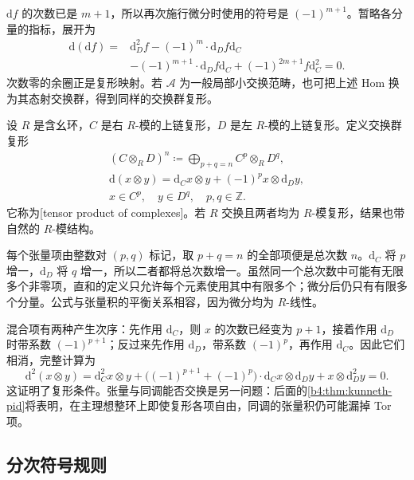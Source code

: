 \(\mathrm{d}f\) 的次数已是 \(m+1\)，所以再次施行微分时使用的符号是 \((-1)^{m+1}\)。暂略各分量的指标，展开为
\[
	\begin{aligned}
		\mathrm{d}(\mathrm{d}f) ={}&\mathrm{d}_D^2f-(-1)^m\cdot\mathrm{d}_Df\mathrm{d}_C\\
		&-(-1)^{m+1}\cdot\mathrm{d}_Df\mathrm{d}_C +(-1)^{2m+1}f\mathrm{d}_C^2=0.
	\end{aligned}
\]
次数零的余圈正是复形映射。若 \(\mathcal A\) 为一般局部小交换范畴，也可把上述 Hom 换为其态射交换群，得到同样的交换群复形。

\begin{definition}\label{b4:def:tensor-complex}
	设 \(R\) 是含幺环，\(C\) 是右 \(R\)-模的上链复形，\(D\) 是左 \(R\)-模的上链复形。定义交换群复形
	\[
		\begin{gathered}
			(C\otimes_R D)^n\coloneqq\bigoplus_{p+q=n}C^p\otimes_R D^q,\\
			\mathrm{d}(x\otimes y)=\mathrm{d}_Cx\otimes y+(-1)^p x\otimes \mathrm{d}_Dy,\\
			x\in C^p,\quad y\in D^q,\quad p,q\in\mathbb Z.
		\end{gathered}
	\]
	它称为[tensor product of complexes]。若 \(R\) 交换且两者均为 \(R\)-模复形，结果也带自然的 \(R\)-模结构。
\end{definition}

每个张量项由整数对 \((p,q)\) 标记，取 \(p+q=n\) 的全部项便是总次数 \(n\)。\(\mathrm{d}_C\) 将 \(p\) 增一，\(\mathrm{d}_D\) 将 \(q\) 增一，所以二者都将总次数增一。虽然同一个总次数中可能有无限多个非零项，直和的定义只允许每个元素使用其中有限多个；微分后仍只有有限多个分量。公式与张量积的平衡关系相容，因为微分均为 \(R\)-线性。

\ProseParagraphBreak
混合项有两种产生次序：先作用 \(\mathrm{d}_C\)，则 \(x\) 的次数已经变为 \(p+1\)，接着作用 \(\mathrm{d}_D\) 时带系数 \((-1)^{p+1}\)；反过来先作用 \(\mathrm{d}_D\)，带系数 \((-1)^p\)，再作用 \(\mathrm{d}_C\)。因此它们相消，完整计算为
\[
	\mathrm{d}^2(x\otimes y)=\mathrm{d}_C^2x\otimes y +\bigl((-1)^{p+1}+(-1)^p\bigr)\cdot\mathrm{d}_Cx\otimes \mathrm{d}_Dy +x\otimes \mathrm{d}_D^2y=0.
\]
这证明了复形条件。张量与同调能否交换是另一问题：后面的\cref{b4:thm:kunneth-pid}将表明，在主理想整环上即使复形各项自由，同调的张量积仍可能漏掉 Tor 项。

\subsection{分次符号规则}
\label{b4:subsec:0502:03}

